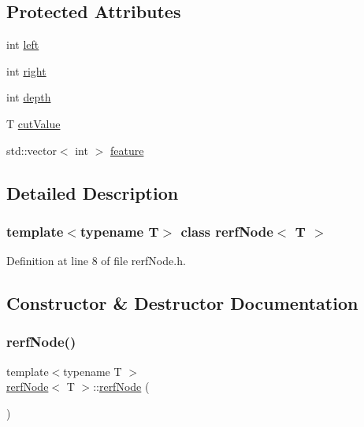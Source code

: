 \subsection*{Protected Attributes}
\begin{DoxyCompactItemize}
\item 
int \hyperlink{classrerfNode_a0ffbd4e13914bfdd0d35e2e737b0a959}{left}
\item 
int \hyperlink{classrerfNode_ae04521c833fe33f2b1cde19bb3cb615f}{right}
\item 
int \hyperlink{classrerfNode_a85845e08b7db33d241ddc3ff6b63799f}{depth}
\item 
T \hyperlink{classrerfNode_afbb93d044e16d18d7502e5d58fa345bf}{cut\+Value}
\item 
std\+::vector$<$ int $>$ \hyperlink{classrerfNode_af41edc70aae781312c3b20311430a89a}{feature}
\end{DoxyCompactItemize}


\subsection{Detailed Description}
\subsubsection*{template$<$typename T$>$\newline
class rerf\+Node$<$ T $>$}



Definition at line 8 of file rerf\+Node.\+h.



\subsection{Constructor \& Destructor Documentation}
\mbox{\label{classrerfNode_a22e89eb08a352567b5880f40b167ced8}} 
\subsubsection{\texorpdfstring{rerf\+Node()}{rerfNode()}}
{\footnotesize\ttfamily template$<$typename T $>$ \\
\hyperlink{classrerfNode}{rerf\+Node}$<$ T $>$\+::\hyperlink{classrerfNode}{rerf\+Node} (\begin{DoxyParamCaption}{ }\end{DoxyParamCaption})\hspace{0.3cm}{\ttfamily [inline]}}



